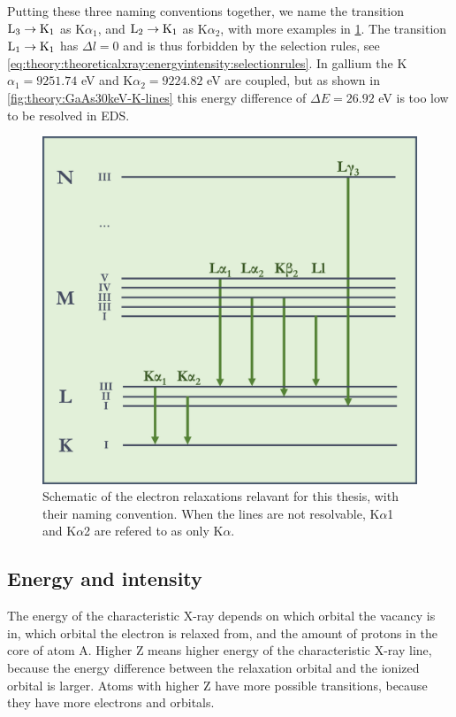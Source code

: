 Putting these three naming conventions together, we name the transition $\textnormal{L}_3 \rightarrow \textnormal{K}_1$ as K$\alpha_1$, and $\textnormal{L}_2 \rightarrow \textnormal{K}_1$ as K$\alpha_2$, with more examples in \cref{fig:theory:theoreticalxray:naming:lines}.
The transition $\textnormal{L}_1 \rightarrow \textnormal{K}_1$ has $\Delta l = 0$ and is thus forbidden by the selection rules, see \cref{eq:theory:theoreticalxray:energyintensity:selectionrules}.
In gallium the K$\alpha_1 = 9251.74$ eV and K$\alpha_2 = 9224.82$ eV \cite{thompson_x-ray_2004} are coupled, but as shown in \cref{fig:theory:GaAs30keV-K-lines} this energy difference of $\Delta E = 26.92$ eV is too low to be resolved in EDS.

\begin{figure}[htp]
    \centering
    \includegraphics[width=0.7\linewidth]{figures/transition_lines.png}
    \caption{
        Schematic of the electron relaxations relavant for this thesis, with their naming convention.
        When the lines are not resolvable, K$\alpha$1 and K$\alpha$2 are refered to as only K$\alpha$.
    }
    \label{fig:theory:theoreticalxray:naming:lines}
\end{figure}



%
%
\subsection{Energy and intensity}
\label{sec:theory:theoreticalxray:energyintensity}

The energy of the characteristic X-ray depends on which orbital the vacancy is in, which orbital the electron is relaxed from, and the amount of protons in the core of atom A. %
Higher Z means higher energy of the characteristic X-ray line, because the energy difference between the relaxation orbital and the ionized orbital is larger.
Atoms with higher Z have more possible transitions, because they have more  electrons and orbitals.

